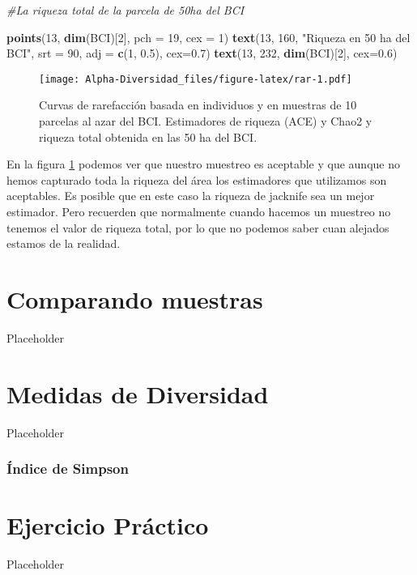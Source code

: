 \documentclass[]{book}
\newenvironment{Shaded}{\begin{snugshade}}{\end{snugshade}}
\newcommand{\KeywordTok}[1]{\textcolor[rgb]{0.13,0.29,0.53}{\textbf{{#1}}}}
\newcommand{\DataTypeTok}[1]{\textcolor[rgb]{0.13,0.29,0.53}{{#1}}}
\newcommand{\DecValTok}[1]{\textcolor[rgb]{0.00,0.00,0.81}{{#1}}}
\newcommand{\FloatTok}[1]{\textcolor[rgb]{0.00,0.00,0.81}{{#1}}}
\newcommand{\StringTok}[1]{\textcolor[rgb]{0.31,0.60,0.02}{{#1}}}
\newcommand{\CommentTok}[1]{\textcolor[rgb]{0.56,0.35,0.01}{\textit{{#1}}}}
\newcommand{\NormalTok}[1]{{#1}}
\begin{document}
\begin{Shaded}
\begin{Highlighting}[]
\CommentTok{#La riqueza total de la parcela de 50ha del BCI}

\KeywordTok{points}\NormalTok{(}\DecValTok{13}\NormalTok{, }\KeywordTok{dim}\NormalTok{(BCI)[}\DecValTok{2}\NormalTok{], }\DataTypeTok{pch =} \DecValTok{19}\NormalTok{, }\DataTypeTok{cex =} \DecValTok{1}\NormalTok{) }
\KeywordTok{text}\NormalTok{(}\DecValTok{13}\NormalTok{, }\DecValTok{160}\NormalTok{, }\StringTok{"Riqueza  en 50 ha del BCI"}\NormalTok{,}
     \DataTypeTok{srt =} \DecValTok{90}\NormalTok{, }\DataTypeTok{adj =} \KeywordTok{c}\NormalTok{(}\DecValTok{1}\NormalTok{, }\FloatTok{0.5}\NormalTok{), }\DataTypeTok{cex=}\FloatTok{0.7}\NormalTok{)}
\KeywordTok{text}\NormalTok{(}\DecValTok{13}\NormalTok{, }\DecValTok{232}\NormalTok{, }\KeywordTok{dim}\NormalTok{(BCI)[}\DecValTok{2}\NormalTok{], }\DataTypeTok{cex=}\FloatTok{0.6}\NormalTok{)}
\end{Highlighting}
\end{Shaded}

\begin{figure}[htbp]
\centering
\texttt{[image: Alpha-Diversidad\_files/figure-latex/rar-1.pdf]}
\caption{\label{fig:rar}Curvas de rarefacción basada en individuos y en
muestras de 10 parcelas al azar del BCI. Estimadores de riqueza (ACE) y
Chao2 y riqueza total obtenida en las 50 ha del BCI.}
\end{figure}

En la figura \ref{fig:rar} podemos ver que nuestro muestreo es aceptable
y que aunque no hemos capturado toda la riqueza del área los estimadores
que utilizamos son aceptables. Es posible que en este caso la riqueza de
jacknife sea un mejor estimador. Pero recuerden que normalmente cuando
hacemos un muestreo no tenemos el valor de riqueza total, por lo que no
podemos saber cuan alejados estamos de la realidad.

\chapter{Comparando muestras}\label{comparando-muestras}

Placeholder

\chapter{Medidas de Diversidad}\label{medidas-de-diversidad}

Placeholder

\subsection{Índice de Simpson}\label{indice-de-simpson}

\chapter{Ejercicio Práctico}\label{ejercicio-practico}

Placeholder


\end{document}
